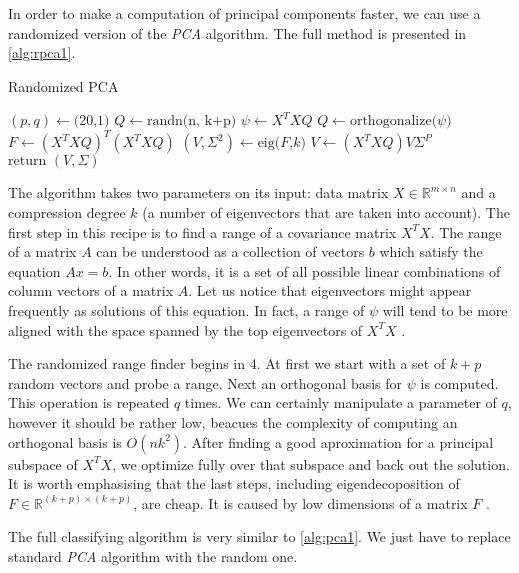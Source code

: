 In order to make a computation of principal components faster, we can use a randomized version of the \textit{PCA} algorithm. The full method is presented in \cref{alg:rpca1}. 

\begin{algorithm}
    \caption{Randomized PCA}\label{alg:rpca1}
    \begin{algorithmic}[1]
        \State $(p,q) \leftarrow \text{(20,1)}$
        \State $Q \leftarrow \text{randn(n, k+p)}$
            \State $\psi \leftarrow X^TXQ$
            \State $Q \leftarrow \text{orthogonalize($\psi$)}$
            \EndFor
            \State $F \leftarrow (X^TXQ)^T(X^TXQ)$
            \State $(V,\Sigma^2) \leftarrow \text{eig($F$,$k$)}$
            \State $V \leftarrow (X^TXQ)V\Sigma^P$
            \State $\text{return } (V, \Sigma)$
        \EndFunction
    \end{algorithmic}
\end{algorithm}

The algorithm takes two parameters on its input: data matrix $X \in \mathbb{R}^{m \times n}$ and a compression degree $k$ (a number of eigenvectors that are taken into account). The first step in this recipe is to find a range of a covariance matrix $X^TX$. The range of a matrix $A$ can be understood as a collection of vectors $b$ which satisfy the equation $Ax=b$. In other words, it is a set of all possible linear combinations of column vectors of a matrix $A$.  Let us notice that eigenvectors might appear frequently as solutions of this equation. In fact, a range of $\psi$ will tend to be more aligned with the space spanned by the top eigenvectors of $X^TX$ \cite{Mineiro}. 

The randomized range finder begins in 4. At first we start with a set of $k+p$ random vectors and probe a range. Next an orthogonal basis for $\psi$ is computed. This operation is repeated $q$ times. We can certainly manipulate a parameter of $q$, however it should be rather low, beacues the complexity of computing an orthogonal basis is $O(nk^2)$. 
After finding a good aproximation for a principal subspace of $X^TX$, we optimize fully over that subspace and back out the solution. It is worth emphasising that the last steps, including eigendecoposition of $F \in \mathbb{R}^{(k+p) \times (k+p)}$, are cheap. It is caused by low dimensions of a matrix $F$ \cite{Mineiro}.

The full classifying algorithm is very similar to \cref{alg:pca1}. We just have to replace standard \textit{PCA} algorithm with the random one.

